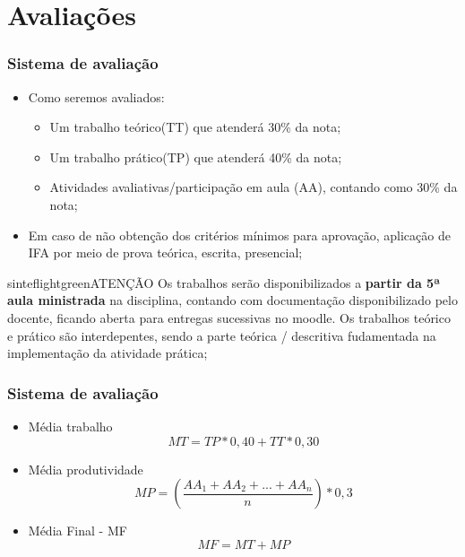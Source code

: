 \documentclass{beamer}
\begin{document}
\section{Avaliações}
\begin{frame}[fragile]\justifying
\frametitle{Sistema de avaliação}
\begin{itemize}
            
            \item Como seremos avaliados:
            \begin{itemize}
                  \item Um trabalho teórico(TT) que atenderá 30\% da nota;
                  \item Um trabalho prático(TP) que atenderá 40\% da nota;
                  \item Atividades avaliativas/participação em aula (AA), contando como 30\% da nota;
            \end{itemize}
            \item Em caso de não obtenção dos critérios mínimos para aprovação, aplicação de IFA por meio de prova teórica, escrita, presencial;
\end{itemize}
\begin{colorblock}[black]{sinteflightgreen}{ATENÇÃO}
      Os trabalhos serão disponibilizados a \textbf{partir da 5ª aula ministrada} na disciplina, contando com documentação disponibilizado pelo docente, ficando aberta para entregas sucessivas no moodle.
      Os trabalhos teórico e prático são interdepentes, sendo a parte teórica / descritiva fudamentada na implementação da atividade prática;
\end{colorblock}

\end{frame}

\begin{frame}[fragile]\justifying
      \frametitle{Sistema de avaliação}
      \begin{itemize}
            \item Média trabalho \[ MT = TP * 0,40 + TT * 0,30\]
            \item Média produtividade \[ MP = \left ( \frac{AA_1 + AA_2 + ... + AA_n}n \right ) * 0,3 \]
            \item Média Final - MF \[MF = MT + MP\]
      \end{itemize}
      
      \end{frame}
      \footlinecolor{}
\end{document}

